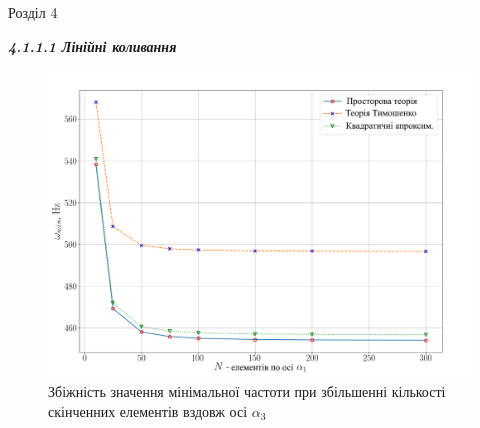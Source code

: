 \documentclass[8pt]{beamer}
\numberwithin{figure}{section}
\numberwithin{equation}{section}
\numberwithin{table}{section}
\begin{document}
\begin{frame}{Розділ 4}

\textbf{\textit{4.1.1.1 Лінійні коливання}}
\\
\vspace{1em}
\begin{figure}
	\includegraphics[scale=0.23]{pic/conv_allukr.png}
		\caption{Збіжність значення мінімальної частоти при збільшенні кількості скінченних елементів вздовж осі $\alpha_3$}
		\label{fig:EE31}
\end{figure}

\end{frame}
\end{document}
